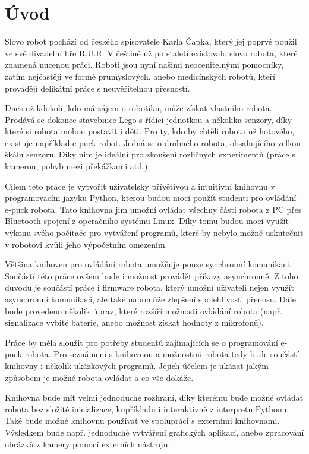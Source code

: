 \chapter*{Úvod}

Slovo robot pochází od českého spisovatele Karla Čapka, který jej poprvé
použil ve své divadelní hře R.U.R. V češtině už po staletí existovalo slovo
robota, které znamená nucenou práci. Roboti jsou nyní našimi neocenitelnými
pomocníky, zatím nejčastěji ve formě průmyslových, anebo medicínských robotů,
kteří provádějí delikátní práce s neuvěřitelnou přesností.

Dnes už kdokoli, kdo má zájem o robotiku, může získat vlastního robota.
Prodává se dokonce stavebnice Lego s řídící jednotkou a několika senzory,
díky které si robota mohou postavit i děti. Pro ty, kdo by chtěli robota už
hotového, existuje například e-puck \cite{epuck} robot. Jedná se o drobného
robota, obsahujícího velkou škálu senzorů. Díky nim je ideální pro zkoušení
rozličných experimentů (práce s kamerou, pohyb mezi překážkami atd.).

Cílem této práce je vytvořit uživatelsky přívětivou a intuitivní knihovnu v
programovacím jazyku Python, kterou budou moci použít studenti pro ovládání
e-puck robota. Tato knihovna jim umožní ovládat všechny části robota z PC
přes Bluetooth spojení z operačního systému Linux. Díky tomu budou moci
využít výkonu svého počítače pro vytváření programů, které by nebylo možné
uskutečnit v robotovi kvůli jeho výpočetním omezením.

Většina knihoven pro ovládání robota umožňuje pouze synchronní komunikaci.
Součástí této práce ovšem bude i možnost provádět příkazy asynchronně. Z
toho důvodu je součástí práce i firmware robota, který umožní uživateli
nejen využít asynchronní komunikaci, ale také napomůže zlepšení spolehlivosti
přenosu. Dále bude provedeno několik úprav, které rozšíří možnosti ovládání
robota (např. signalizace vybité baterie, anebo možnost získat hodnoty z
mikrofonů).

Práce by měla sloužit pro potřeby studentů zajímajících se o programování
e-puck robota. Pro seznámení s knihovnou a možnostmi robota tedy bude součástí
knihovny i několik ukázkových programů. Jejich účelem je ukázat jakým způsobem
je možné robota ovládat a co vše dokáže.

Knihovna bude mít velmi jednoduché rozhraní, díky kterému bude možné
ovládat robota bez složité inicializace, kupříkladu i interaktivně z
interpretu Pythonu. Také bude možné knihovnu používat ve spolupráci s
externími knihovnami. Výsledkem bude např. jednoduché vytváření grafických
aplikací, anebo zpracování obrázků z kamery pomocí externích nástrojů.

